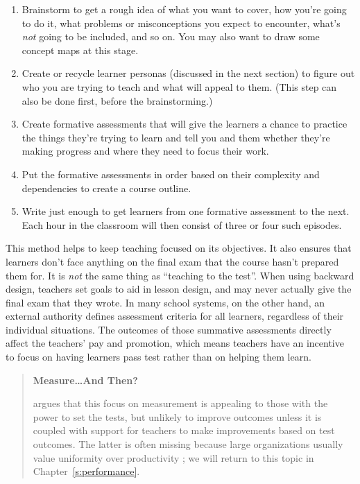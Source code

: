 \begin{enumerate}
\item
  Brainstorm to get a rough idea of what you want to cover, how
  you're going to do it, what problems or misconceptions you expect
  to encounter, what's \emph{not} going to be included, and so on. You may
  also want to draw some concept maps at this stage.
\item
  Create or recycle learner personas (discussed in the next section)
  to figure out who you are trying to teach and what will appeal to
  them. (This step can also be done first, before the brainstorming.)
\item
  Create formative assessments that will give the learners a chance
  to practice the things they're trying to learn and tell you and
  them whether they're making progress and where they need to focus
  their work.
\item
  Put the formative assessments in order based on their complexity
  and dependencies to create a course outline.
\item
  Write just enough to get learners from one formative assessment to
  the next. Each hour in the classroom will then consist of three or
  four such episodes.
\end{enumerate}

This method helps to keep teaching focused on its objectives. It also
ensures that learners don't face anything on the final exam that the
course hasn't prepared them for. It is \emph{not} the same thing as
``teaching to the test''. When using backward design, teachers set goals
to aid in lesson design, and may never actually give the final exam
that they wrote. In many school systems, on the other hand, an
external authority defines assessment criteria for all learners,
regardless of their individual situations. The outcomes of those
summative assessments directly affect the teachers' pay and promotion,
which means teachers have an incentive to focus on having learners
pass test rather than on helping them learn.

\begin{quote}\setlength{\parindent}{0pt}
\textbf{Measure\ldots{}And Then?}

\cite{Gree2014} argues that this focus on measurement is
appealing to those with the power to set the tests, but unlikely to
improve outcomes unless it is coupled with support for teachers to
make improvements based on test outcomes. The latter is often
missing because large organizations usually value uniformity over
productivity \cite{Scot1998}; we will return to this topic in
Chapter~\ref{s:performance}.
\end{quote}

